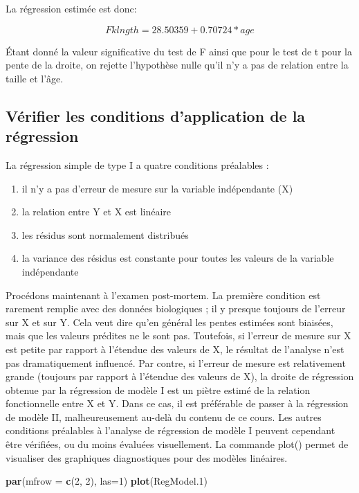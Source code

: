 \documentclass[12pt,]{book}
\newenvironment{Shaded}{\begin{snugshade}}{\end{snugshade}}
\newcommand{\DataTypeTok}[1]{\textcolor[rgb]{0.13,0.29,0.53}{#1}}
\newcommand{\DecValTok}[1]{\textcolor[rgb]{0.00,0.00,0.81}{#1}}
\newcommand{\FloatTok}[1]{\textcolor[rgb]{0.00,0.00,0.81}{#1}}
\newcommand{\KeywordTok}[1]{\textcolor[rgb]{0.13,0.29,0.53}{\textbf{#1}}}
\newcommand{\NormalTok}[1]{#1}
\providecommand{\tightlist}{%
  \setlength{\itemsep}{0pt}\setlength{\parskip}{0pt}}
\begin{document}
La régression estimée est donc:

\[ Fklngth = 28.50359 + 0.70724 * age\]

Étant donné la valeur significative du test de F ainsi que pour le test de t pour la pente de la droite, on rejette l'hypothèse nulle qu'il n'y a pas de relation entre la taille et l'âge.

\hypertarget{vuxe9rifier-les-conditions-dapplication-de-la-ruxe9gression}{%
\subsection{Vérifier les conditions d'application de la régression}\label{vuxe9rifier-les-conditions-dapplication-de-la-ruxe9gression}}

La régression simple de type I a quatre conditions préalables :

\begin{enumerate}
\def\labelenumi{\arabic{enumi}.}
\tightlist
\item
  il n'y a pas d'erreur de mesure sur la variable indépendante (X)
\item
  la relation entre Y et X est linéaire
\item
  les résidus sont normalement distribués
\item
  la variance des résidus est constante pour toutes les valeurs de la variable indépendante
\end{enumerate}

Procédons maintenant à l'examen post-mortem. La première
condition est rarement remplie avec des données biologiques ; il y
presque toujours de l'erreur sur X et sur Y. Cela veut dire qu'en
général les pentes estimées sont biaisées, mais que les valeurs prédites
ne le sont pas. Toutefois, si l'erreur de mesure sur X est petite par
rapport à l'étendue des valeurs de X, le résultat de l'analyse n'est pas
dramatiquement influencé. Par contre, si l'erreur de mesure est
relativement grande (toujours par rapport à l'étendue des valeurs de
X), la droite de régression obtenue par la régression de modèle I est
un piètre estimé de la relation fonctionnelle entre X et Y. Dans ce cas,
il est préférable de passer à la régression de modèle II,
malheureusement au-delà du contenu de ce cours.
Les autres conditions préalables à l'analyse de régression de modèle I
peuvent cependant être vérifiées, ou du moins évaluées visuellement.
La commande plot() permet de visualiser des graphiques
diagnostiques pour des modèles linéaires.

\begin{Shaded}
\begin{Highlighting}[]
\KeywordTok{par}\NormalTok{(}\DataTypeTok{mfrow =} \KeywordTok{c}\NormalTok{(}\DecValTok{2}\NormalTok{, }\DecValTok{2}\NormalTok{), }\DataTypeTok{las=}\DecValTok{1}\NormalTok{)}
\KeywordTok{plot}\NormalTok{(RegModel}\FloatTok{.1}\NormalTok{)}
\end{Highlighting}
\end{Shaded}
\end{document}
